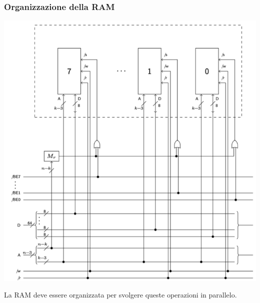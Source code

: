 			\subsubsection{Organizzazione della RAM}
			\begin{center}
				\includegraphics[scale=0.75]{img/10.PNG}
			\end{center} 
			La RAM deve essere organizzata per svolgere queste operazioni in parallelo.  
